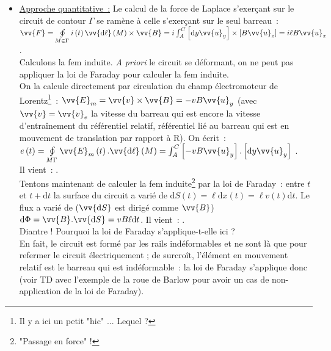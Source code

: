 \documentclass{article}
\let\oldoint\oint
\renewcommand{\oint}{\oldoint\limits}
\renewcommand\overrightarrow{\vv}
\begin{document}
\begin{itemize}
\item \underline{Approche quantitative :} Le calcul de la force de
Laplace s'exerçant sur le circuit de contour $\Gamma$ se ramène à
celle s'exerçant sur le seul barreau : \\
$\overrightarrow{F} = \oint_{M\in
\Gamma}i\left(t\right)\overrightarrow{\mathrm{d}\ell}\left(M\right)\times \overrightarrow{B} =
i\int_{A}^{C}\left[\mathrm{d}y\overrightarrow{u}_{y}\right] \times
\left[B\overrightarrow{u}_{z}\right] = i\ell B \overrightarrow{u}_{x}$. \\
Calculons la fem induite. \textit{A priori} le circuit se déformant,
on ne peut pas appliquer la loi de Faraday pour calculer la fem
induite. \\
On la calcule directement par circulation du champ électromoteur de
Lorentz\footnote{Il y a ici un petit "hic" ... Lequel ?} :
$\overrightarrow{E}_{m} = \overrightarrow{v}\times
\overrightarrow{B} = -vB\overrightarrow{u}_{y}$ (avec
$\overrightarrow{v}=\overrightarrow{v}_{e}$ la vitesse du barreau
qui est encore la vitesse d'entraînement du référentiel relatif,
référentiel lié au barreau qui est en mouvement de translation par
rapport à R). On écrit : \\
$e\left(t\right) = \oint_{M \Gamma}
\overrightarrow{E}_{m}\left(t\right).\overrightarrow{\mathrm{d}\ell}\left(M\right)=
\int_{A}^{C}\left[-vB\overrightarrow{u}_{y}\right].\left[\mathrm{d}y\overrightarrow{u}_{y}\right]$
. \\
Il vient : . \\
Tentons maintenant de calculer la fem induite\footnote{"Passage en
force" !} par la loi de Faraday : entre $t$ et $t+\mathrm{d}t$ la surface du
circuit a varié de $\mathrm{d}S\left(t\right) = \ell \mathrm{d}x\left(t\right) = \ell v\left(t\right)\mathrm{d}t$. Le flux a
varié de ($\overrightarrow{\mathrm{d}S}$ est dirigé comme
$\overrightarrow{B}$) $\mathrm{d}\Phi =
\overrightarrow{B}.\overrightarrow{\mathrm{d}S} = vB\ell \mathrm{d}t$. Il vient :
. \\
Diantre ! Pourquoi la loi de Faraday s'applique-t-elle ici ?\\
En fait, le circuit est formé par les rails indéformables et ne sont
là que pour refermer le circuit électriquement ; de surcroît,
l'élément en mouvement relatif est le barreau qui est indéformable :
la loi de Faraday s'applique donc (voir TD avec l'exemple de la roue
de Barlow
pour avoir un cas de non-application de la loi de Faraday). \\

\end{itemize}
\end{document}
